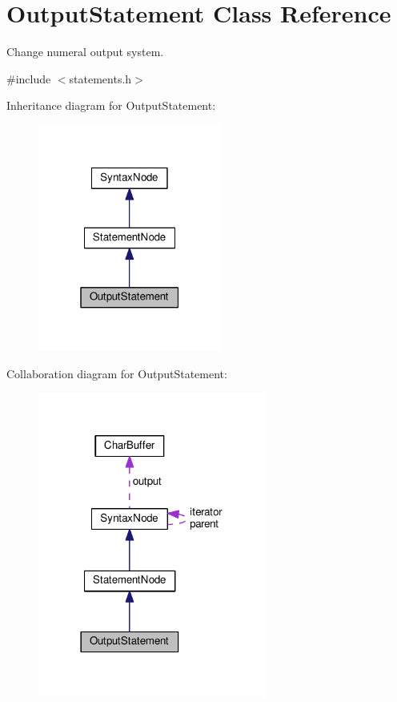 \hypertarget{classOutputStatement}{}\section{Output\+Statement Class Reference}
\label{classOutputStatement}


Change numeral output system.  




{\ttfamily \#include $<$statements.\+h$>$}



Inheritance diagram for Output\+Statement\+:\nopagebreak
\begin{figure}[H]
\begin{center}
\leavevmode
\includegraphics[width=171pt]{classOutputStatement__inherit__graph}
\end{center}
\end{figure}


Collaboration diagram for Output\+Statement\+:\nopagebreak
\begin{figure}[H]
\begin{center}
\leavevmode
\includegraphics[width=213pt]{classOutputStatement__coll__graph}
\end{center}
\end{figure}
